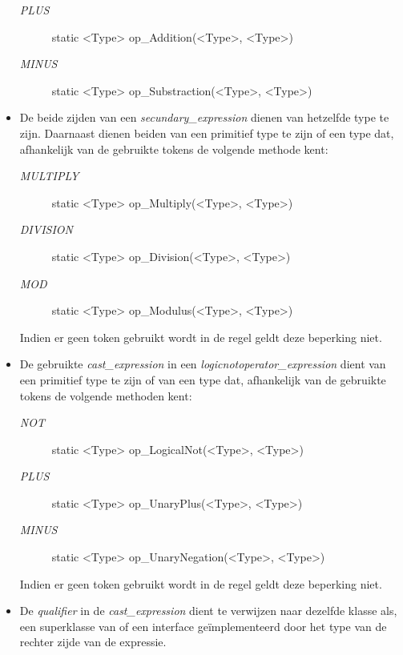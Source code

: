 \begin{itemize}
	\begin{description}
		\item[\textit{PLUS}] static \textless{}Type\textgreater{} op\_Addition(\textless{}Type\textgreater{}, \textless{}Type\textgreater{})
		\item[\textit{MINUS}] static \textless{}Type\textgreater{} op\_Substraction(\textless{}Type\textgreater{}, \textless{}Type\textgreater{})
	\end{description}
	\item De beide zijden van een \textit{secundary\_expression} dienen van hetzelfde type te zijn. Daarnaast dienen beiden van een primitief type te zijn of een type dat, afhankelijk van de gebruikte tokens de volgende methode kent:
	\begin{description}
		\item[\textit{MULTIPLY}] static \textless{}Type\textgreater{} op\_Multiply(\textless{}Type\textgreater{}, \textless{}Type\textgreater{})
		\item[\textit{DIVISION}] static \textless{}Type\textgreater{} op\_Division(\textless{}Type\textgreater{}, \textless{}Type\textgreater{})
		\item[\textit{MOD}] static \textless{}Type\textgreater{} op\_Modulus(\textless{}Type\textgreater{}, \textless{}Type\textgreater{})
	\end{description}
	Indien er geen token gebruikt wordt in de regel geldt deze beperking niet.
	\item De gebruikte \textit{cast\_expression} in een \textit{logicnotoperator\_expression} dient van een primitief type te zijn of van een type dat, afhankelijk van de gebruikte tokens de volgende methoden kent:
	\begin{description}
		\item[\textit{NOT}] static \textless{}Type\textgreater{} op\_LogicalNot(\textless{}Type\textgreater{}, \textless{}Type\textgreater{})
		\item[\textit{PLUS}] static \textless{}Type\textgreater{} op\_UnaryPlus(\textless{}Type\textgreater{}, \textless{}Type\textgreater{})
		\item[\textit{MINUS}] static \textless{}Type\textgreater{} op\_UnaryNegation(\textless{}Type\textgreater{}, \textless{}Type\textgreater{})
	\end{description}
	Indien er geen token gebruikt wordt in de regel geldt deze beperking niet.
	\item De \textit{qualifier} in de \textit{cast\_expression} dient te verwijzen naar dezelfde klasse als, een superklasse van of een interface ge\"implementeerd door het type van de rechter zijde van de expressie.

\end{itemize}
